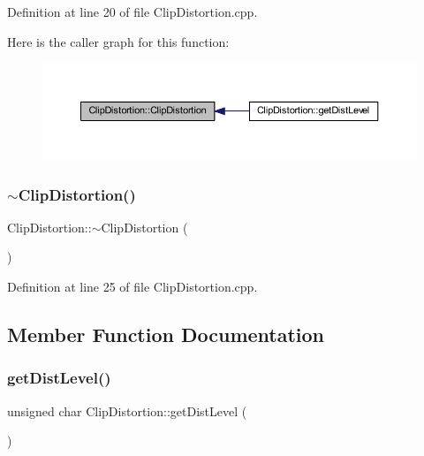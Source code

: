Definition at line 20 of file Clip\+Distortion.\+cpp.

Here is the caller graph for this function\+:
\nopagebreak
\begin{figure}[H]
\begin{center}
\leavevmode
\includegraphics[width=350pt]{class_clip_distortion_a86506486f99934a97cd2de7cceee3f0d_icgraph}
\end{center}
\end{figure}
\mbox{\label{class_clip_distortion_a4128fd1ee6344103f10499bd97ab157f}} 
\subsubsection{\texorpdfstring{$\sim$\+Clip\+Distortion()}{~ClipDistortion()}}
{\footnotesize\ttfamily Clip\+Distortion\+::$\sim$\+Clip\+Distortion (\begin{DoxyParamCaption}{ }\end{DoxyParamCaption})}



Definition at line 25 of file Clip\+Distortion.\+cpp.



\subsection{Member Function Documentation}
\mbox{\label{class_clip_distortion_a2a2656f1baaaa42f9c240040ecee9c68}} 
\subsubsection{\texorpdfstring{get\+Dist\+Level()}{getDistLevel()}}
{\footnotesize\ttfamily unsigned char Clip\+Distortion\+::get\+Dist\+Level (\begin{DoxyParamCaption}{ }\end{DoxyParamCaption})\hspace{0.3cm}{\ttfamily [inline]}}



